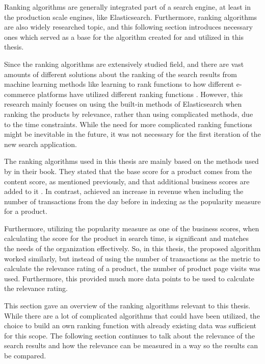 Ranking algorithms are generally integrated part of a search engine, at least in
the production scale engines, like Elasticsearch.
Furthermore, ranking algorithms are also widely researched topic, and this following
section introduces necessary ones which served as a base for the 
algorithm created for and utilized in this thesis.

Since the ranking algorithms are extensively studied field, and there are vast amounts of different solutions
about the ranking of the search results from machine learning methods like learning to rank functions
\cite{l2rEntitiesWeb, learningRankEC} to how different e-commerce platforms have utilized different ranking
functions \cite{amazonJoyRanking, predictionRelevanceSearchResults, turningClickPurhases}.
However, this research mainly focuses on using the built-in methods of Elasticsearch
when ranking the products by relevance, rather than using complicated methods, due to the time constraints.
While the need for more complicated ranking functions might be inevitable in the future,
it was not necessary for the first iteration of the new search application.


The ranking algorithms used in this thesis are mainly based on the methods used by
\citeauthor{relevantSearch} \cite{relevantSearch} in their book.
They stated that the base score for a product comes from the content score, as mentioned previously,
and that additional business scores are added to it \cite{relevantSearch}.
In contrast, \citeauthor{enhancingSearchBestSelling} \cite{enhancingSearchBestSelling} achieved an 
increase in revenue when including the number of transactions from the day before in indexing
as the popularity measure for a product.

Furthermore, utilizing the popularity measure as one of the business scores, 
when calculating the score for the product in search time,
is significant and matches the needs of the organization effectively.
So, in this thesis, the proposed algorithm worked similarly, but instead of using the number of transactions
as the metric to calculate the relevance rating of a product, the number of product page visits was used.
Furthermore, this provided much more data points to be used to calculate the relevance rating.

This section gave an overview of the ranking algorithms relevant to this thesis. 
While there are a lot of complicated algorithms that could have been utilized, the choice to
build an own ranking function with already existing data was sufficient for this scope.
The following section continues to talk about the relevance of the search results 
and how the relevance can be measured in a way so the results can be compared.


